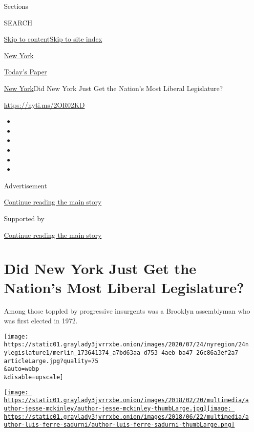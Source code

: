 Sections

SEARCH

\protect\hyperlink{site-content}{Skip to
content}\protect\hyperlink{site-index}{Skip to site index}

\href{https://www.nytimes3xbfgragh.onion/section/nyregion}{New York}

\href{https://myaccount.nytimes3xbfgragh.onion/auth/login?response_type=cookie\&client_id=vi}{}

\href{https://www.nytimes3xbfgragh.onion/section/todayspaper}{Today's
Paper}

\href{/section/nyregion}{New York}\textbar{}Did New York Just Get the
Nation's Most Liberal Legislature?

\url{https://nyti.ms/2OR02KD}

\begin{itemize}
\item
\item
\item
\item
\item
\item
\end{itemize}

Advertisement

\protect\hyperlink{after-top}{Continue reading the main story}

Supported by

\protect\hyperlink{after-sponsor}{Continue reading the main story}

\hypertarget{did-new-york-just-get-the-nations-most-liberal-legislature}{%
\section{Did New York Just Get the Nation's Most Liberal
Legislature?}\label{did-new-york-just-get-the-nations-most-liberal-legislature}}

Among those toppled by progressive insurgents was a Brooklyn assemblyman
who was first elected in 1972.

\texttt{[image: https://static01.graylady3jvrrxbe.onion/images/2020/07/24/nyregion/24nylegislature1/merlin\_173641374\_a7bd63aa-d753-4aeb-ba47-26c86a3ef2a7-articleLarge.jpg?quality=75\\\&auto=webp\\\&disable=upscale]}

\href{https://www.nytimes3xbfgragh.onion/by/jesse-mckinley}{\texttt{[image: https://static01.graylady3jvrrxbe.onion/images/2018/02/20/multimedia/author-jesse-mckinley/author-jesse-mckinley-thumbLarge.jpg]}}\href{https://www.nytimes3xbfgragh.onion/by/luis-ferre-sadurni}{\texttt{[image: https://static01.graylady3jvrrxbe.onion/images/2018/06/22/multimedia/author-luis-ferre-sadurni/author-luis-ferre-sadurni-thumbLarge.png]}}


